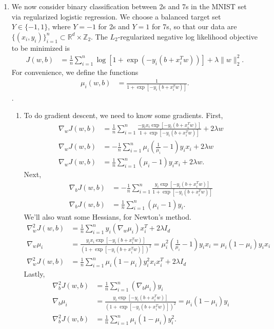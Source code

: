 \documentclass[11pt,letterpaper]{article}
\numberwithin{equation}{section}
\numberwithin{figure}{section}
\begin{document}
\begin{enumerate}
	\item We now consider binary classification between 2s and 7s in the MNIST set via regularized logistic regression. We choose a balanced target set $Y \in \{-1,1\}$, where $Y=-1$ for 2s and $Y = 1$ for 7s, so that our data are $\{(x_i,y_i)\}_{i=1}^n \subset \mathbb{R}^d \times \mathbb{Z}_2$. The $L_2$-regularized negative log likelihood objective to be minimized is
	\begin{align*}
		J(w,b) &= \frac{1}{n} \sum_{i=1}^n \log\left[1 + \exp\left(-y_i(b+x_i^T w)\right)\right] + \lambda \|w\|_2^2.
	\end{align*}
	For convenience, we define the functions
	\begin{align*}
		\mu_i(w,b) &= \frac{1}{1+\exp\left[-y_i(b+x_i^T w)\right]}.
	\end{align*}.
	\begin{enumerate}
		\item To do gradient descent, we need to know some gradients. First,
		\begin{align*}
			\nabla_w J(w,b) &= \frac{1}{n} \sum_{i=1}^n \frac{-y_i x_i \exp\left[-y_i(b + x_i^T w)\right]}{1 + \exp\left[-y_i(b+x_i^T w)\right]} + 2\lambda w\\
			\nabla_w J(w,b) &= -\frac{1}{n} \sum_{i=1}^n \mu_i \left(\frac{1}{\mu_i} - 1\right) y_i x_i + 2\lambda w\\
			\nabla_w J(w,b) &= \frac{1}{n} \sum_{i=1}^n (\mu_i - 1) y_i x_i + 2\lambda w.
		\end{align*}
		Next,
		\begin{align*}
			\nabla_b J(w,b) &= -\frac{1}{n} \sum_{i=1}^n \frac{y_i \exp\left[-y_i(b + x_i^T w)\right]}{1+\exp\left[-y_i(b+x_i^T w)\right]}\\
			\nabla_b J(w,b) &= \frac{1}{n} \sum_{i=1}^n (\mu_i -1) y_i.
		\end{align*}
		We'll also want some Hessians, for Newton's method.
		\begin{align*}
			\nabla^2_w J(w,b) &= \frac{1}{n} \sum_{i=1}^n y_i (\nabla_w \mu_i) x_i^T + 2\lambda I_d\\
			\nabla_w \mu_i &= \frac{y_i x_i \exp\left[-y_i(b+x_i^T w)\right]}{\left(1+\exp\left[-y_i(b+x_i^T w)\right]\right)^2} = \mu_i^2 \left(\frac{1}{\mu_i} - 1\right) y_i x_i = \mu_i (1- \mu_i) y_i x_i\\
			\nabla^2_w J(w,b) &= \frac{1}{n} \sum_{i=1}^n \mu_i (1-\mu_i) y_i^2 x_i x_i^T + 2 \lambda I_d
		\end{align*}
		Lastly,
		\begin{align*}
			\nabla^2_b J(w,b) &= \frac{1}{n} \sum_{i=1}^n (\nabla_b \mu_i) y_i\\
			\nabla_b \mu_i &= \frac{y_i \exp\left[-y_i(b+x_i^T w)\right]}{\left(1+\exp\left[-y_i(b+x_i^T w)\right]\right)^2} = \mu_i(1-\mu_i)y_i\\
			\nabla^2_b J(w,b) &= \frac{1}{n} \sum_{i=1}^n \mu_i(1-\mu_i) y_i^2.
		\end{align*}
	\end{enumerate}
\end{enumerate}
\end{document}

